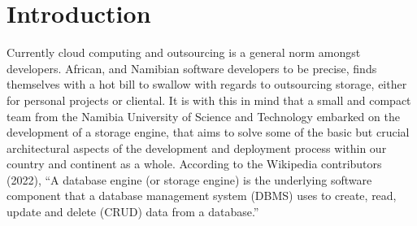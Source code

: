 \documentclass[11pt,a4paper,oneside]{book} %
\numberwithin{equation}{section}
\begin{document}
\section{Introduction}
Currently cloud computing and outsourcing is a general norm amongst developers. African,
and Namibian software developers to be precise, finds themselves with a hot bill to swallow with
regards to outsourcing storage, either for personal projects or cliental. It is with this in mind
that a small and compact team from the Namibia University of Science and
Technology embarked on the development of a storage engine, that aims to solve some of the basic but crucial architectural aspects of the development and deployment process within our country and continent as a whole.
According to the Wikipedia contributors (2022), “A database engine (or storage engine) is the
underlying software component that a database management system (DBMS) uses to create,
read, update and delete (CRUD) data from a database.” 

\setlength{\parskip}{10pt}
\end{document}

